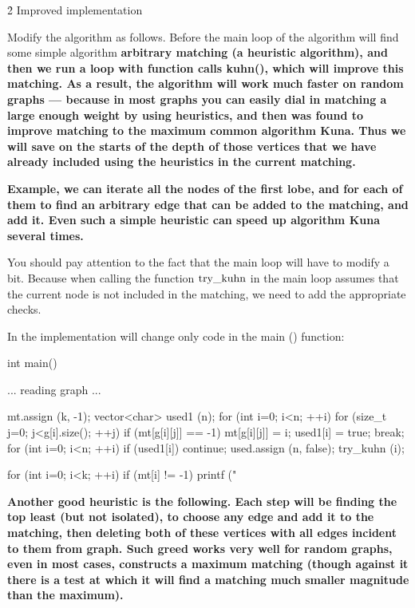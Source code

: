 \h2{ Improved implementation }

Modify the algorithm as follows. Before the main loop of the algorithm will find some simple algorithm \bf{arbitrary matching} (\bf{a heuristic algorithm}), and then we run a loop with function calls kuhn(), which will improve this matching. As a result, the algorithm will work much faster on random graphs --- because in most graphs you can easily dial in matching a large enough weight by using heuristics, and then was found to improve matching to the maximum common algorithm Kuna. Thus we will save on the starts of the depth of those vertices that we have already included using the heuristics in the current matching.

\bf{Example}, we can iterate all the nodes of the first lobe, and for each of them to find an arbitrary edge that can be added to the matching, and add it. Even such a simple heuristic can speed up algorithm Kuna several times.

You should pay attention to the fact that the main loop will have to modify a bit. Because when calling the function $\rm try\_kuhn$ in the main loop assumes that the current node is not included in the matching, we need to add the appropriate checks.

In the implementation will change only code in the main () function:

\code
int main() {
... reading graph ...

mt.assign (k, -1);
vector<char> used1 (n);
for (int i=0; i<n; ++i)
for (size_t j=0; j<g[i].size(); ++j)
if (mt[g[i][j]] == -1) {
mt[g[i][j]] = i;
used1[i] = true;
break;
}
for (int i=0; i<n; ++i) {
if (used1[i]) continue;
used.assign (n, false);
try_kuhn (i);
}

for (int i=0; i<k; ++i)
if (mt[i] != -1)
printf ("%
}
\endcode

\bf{Another good heuristic} is the following. Each step will be finding the top least (but not isolated), to choose any edge and add it to the matching, then deleting both of these vertices with all edges incident to them from graph. Such greed works very well for random graphs, even in most cases, constructs a maximum matching (though against it there is a test at which it will find a matching much smaller magnitude than the maximum).

